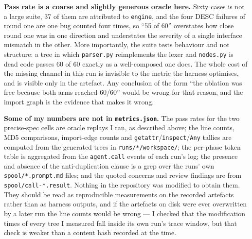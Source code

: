 \documentclass[11pt]{article}
\begin{document}
\textbf{Pass rate is a coarse and slightly generous oracle here.} Sixty cases is not a large
suite, 37 of them are attributed to \texttt{engine}, and the four DESC failures of round one are
one bug counted four times, so ``55 of 60'' overstates how close round one was in one direction
and understates the severity of a single interface mismatch in the other. More importantly, the
suite tests behaviour and not structure: a tree in which \texttt{parser.py} reimplements the lexer
and \texttt{nodes.py} is dead code passes 60 of 60 exactly as a well-composed one does. The whole
cost of the missing channel in this run is invisible to the metric the harness optimises, and is
visible only in the artefact. Any conclusion of the form ``the ablation was free because both arms
reached 60/60'' would be wrong for that reason, and the import graph is the evidence that makes it
wrong.

\textbf{Some of my numbers are not in \texttt{metrics.json}.} The pass rates for the two
precise-spec cells are oracle replays I ran, as described above; the line counts, MD5 comparisons,
import-edge counts and \texttt{getattr}/\texttt{inspect}/\texttt{Any} tallies are computed from
the generated trees in \texttt{runs/*/workspace/}; the per-phase token table is aggregated from
the \texttt{agent.call} events of each run's log; the presence and absence of the
anti-duplication clause is a grep over the runs' own \texttt{spool/*.prompt.md} files; and the
quoted concerns and review findings are from \texttt{spool/call-*.result}. Nothing in the
repository was modified to obtain them. They should be read as reproducible measurements on the
recorded artefacts rather than as harness outputs, and if the artefacts on disk were ever
overwritten by a later run the line counts would be wrong --- I checked that the modification
times of every tree I measured fall inside its own run's trace window, but that check is weaker
than a content hash recorded at the time.
\end{document}
